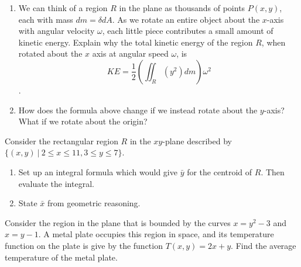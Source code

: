 {\begin{problem}
\begin{enumerate}
  \item We can think of a region $R$ in the plane as thousands of points $P(x,y)$, each with mass $dm=\delta dA$. As we rotate an entire object about the $x$-axis with angular velocity $\omega$, each little piece contributes a small amount of kinetic energy. Explain why the total kinetic energy of the region $R$, when rotated about the $x$ axis at angular speed $\omega$, is
$$KE= \frac{1}{2}\left(\iint_R (y^2)dm\right)\omega^2$$.  
  \item How does the formula above change if we instead rotate about the $y$-axis? What if we rotate about the origin?
 \end{enumerate}
\end{problem}

} %








\begin{problem}
Consider the rectangular region $R$ in the $xy$-plane described by $\{(x,y)\ |\ 2\leq x\leq 11, 3\leq y\leq 7\}$.
\begin{enumerate}
 \item Set up an integral formula which would give $\bar y$ for the centroid of $R$.  Then evaluate the integral.
 \item State $\bar x$ from geometric reasoning.
\end{enumerate}
\end{problem}



\begin{problem}
 Consider the region in the plane that is bounded by the curves $x=y^2-3$ and $x=y-1$.  A metal plate occupies this region in space, and its temperature function on the plate is give by the function $T(x,y)=2x+y$.  Find the average temperature of the metal plate.
\end{problem}

